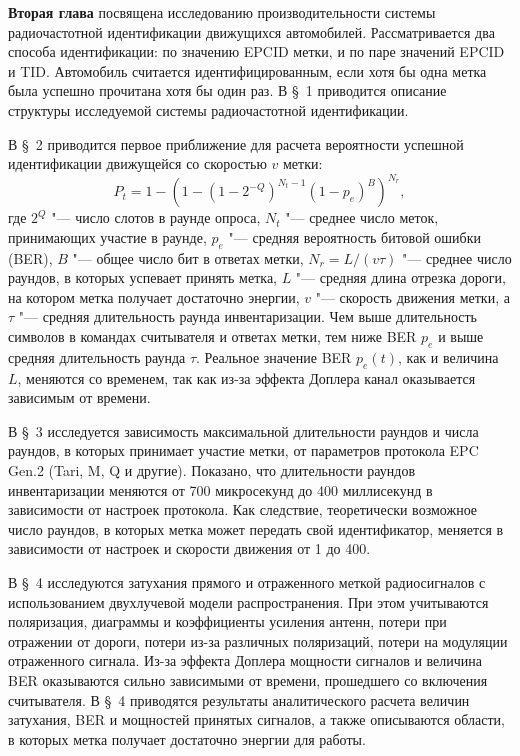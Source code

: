 \textbf{Вторая глава} посвящена исследованию производительности системы радиочастотной идентификации движущихся автомобилей. Рассматривается два способа идентификации: по значению EPCID метки, и по паре значений EPCID и TID. Автомобиль считается идентифицированным, если хотя бы одна метка была успешно прочитана хотя бы один раз. В \S~1 приводится описание структуры исследуемой системы радиочастотной идентификации.

В \S~2 приводится первое приближение для расчета вероятности успешной идентификации движущейся со скоростью $v$ метки:
\[
P_t = 1 - \left( 1 - (1 - 2^{-Q})^{N_t-1} (1 - p_e)^B \right)^{N_r},
\]
где $2^Q$ "--- число слотов в раунде опроса, $N_t$ "--- среднее число меток, принимающих участие в раунде, $p_e$ "--- средняя вероятность битовой ошибки (BER), $B$ "--- общее число бит в ответах метки, $N_r = L / (v \tau)$ "--- среднее число раундов, в которых успевает принять метка, $L$ "--- средняя длина отрезка дороги, на котором метка получает достаточно энергии, $v$ "--- скорость движения метки, а $\tau$ "--- средняя длительность раунда инвентаризации. Чем выше длительность символов в командах считывателя и ответах метки, тем ниже BER $p_e$ и выше средняя длительность раунда $\tau$. Реальное значение BER $p_e(t)$, как и величина $L$, меняются со временем, так как из-за эффекта Доплера канал оказывается зависимым от времени.

В \S~3 исследуется зависимость максимальной длительности раундов и числа раундов, в которых принимает участие метки, от параметров протокола EPC Gen.2 (Tari, M, Q и другие). Показано, что длительности раундов инвентаризации меняются от 700 микросекунд до 400 миллисекунд в зависимости от настроек протокола. Как следствие, теоретически возможное число раундов, в которых метка может передать свой идентификатор, меняется в зависимости от настроек и скорости движения от 1 до 400.

В \S~4 исследуются затухания прямого и отраженного меткой радиосигналов с использованием двухлучевой модели распространения. При этом учитываются поляризация, диаграммы и коэффициенты усиления антенн, потери при отражении от дороги, потери из-за различных поляризаций, потери на модуляции отраженного сигнала. Из-за эффекта Доплера мощности сигналов и величина BER оказываются сильно зависимыми от времени, прошедшего со включения считывателя. В \S~4 приводятся результаты аналитического расчета величин затухания, BER и мощностей принятых сигналов, а также описываются области, в которых метка получает достаточно энергии для работы.

